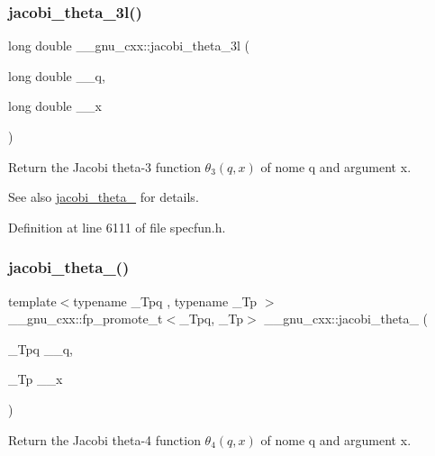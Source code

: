\subsubsection{\texorpdfstring{jacobi\+\_\+theta\+\_\+3l()}{jacobi\_theta\_3l()}}
{\footnotesize\ttfamily long double \+\_\+\+\_\+gnu\+\_\+cxx\+::jacobi\+\_\+theta\+\_\+3l (\begin{DoxyParamCaption}\item[{long double}]{\+\_\+\+\_\+q,  }\item[{long double}]{\+\_\+\+\_\+x }\end{DoxyParamCaption})\hspace{0.3cm}{\ttfamily [inline]}}

Return the Jacobi theta-\/3 function $ \theta_3(q,x) $ of nome {\ttfamily q} and argument {\ttfamily x}.

\begin{DoxySeeAlso}{See also}
\hyperlink{group__mathsf__gnu_gaf4eac2990db1dadba66ae688ceaa6403}{jacobi\+\_\+theta\+\_} for details. 
\end{DoxySeeAlso}


Definition at line 6111 of file specfun.\+h.

\mbox{\label{group__mathsf__gnu_ga676501b6284d5702a3dc61252e6c78ab}} 
\subsubsection{\texorpdfstring{jacobi\+\_\+theta\+\_()}{jacobi\_theta\_4()}}
{\footnotesize\ttfamily template$<$typename \+\_\+\+Tpq , typename \+\_\+\+Tp $>$ \\
\+\_\+\+\_\+gnu\+\_\+cxx\+::fp\+\_\+promote\+\_\+t$<$\+\_\+\+Tpq, \+\_\+\+Tp$>$ \+\_\+\+\_\+gnu\+\_\+cxx\+::jacobi\+\_\+theta\+\_ (\begin{DoxyParamCaption}\item[{\+\_\+\+Tpq}]{\+\_\+\+\_\+q,  }\item[{\+\_\+\+Tp}]{\+\_\+\+\_\+x }\end{DoxyParamCaption})\hspace{0.3cm}{\ttfamily [inline]}}

Return the Jacobi theta-\/4 function $ \theta_4(q,x) $ of nome {\ttfamily q} and argument {\ttfamily x}.

